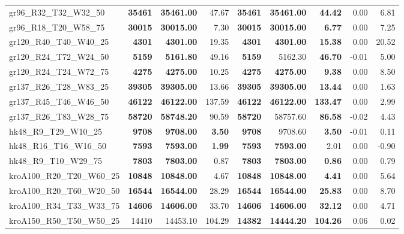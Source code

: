 \documentclass{singlecol-new}
\begin{document}
\begin{scriptsize}
\begin{longtable}{lrrrrrrrr}
		gr96\_R32\_T32\_W32\_50 & \textbf{35461} & \textbf{35461.00} & 47.67 & \textbf{35461} & \textbf{35461.00} & \textbf{44.42} & 0.00 & 6.81 \\
		gr96\_R18\_T20\_W58\_75 & \textbf{30015} & \textbf{30015.00} & 7.30 & \textbf{30015} & \textbf{30015.00} & \textbf{6.77} & 0.00 & 7.25 \\
		gr120\_R40\_T40\_W40\_25 & \textbf{4301} & \textbf{4301.00} & 19.35 & \textbf{4301} & \textbf{4301.00} & \textbf{15.38} & 0.00 & 20.52 \\
		gr120\_R24\_T72\_W24\_50 & \textbf{5159} & \textbf{5161.80} & 49.16 & \textbf{5159} & 5162.30 & \textbf{46.70} & -0.01 & 5.00 \\
		gr120\_R24\_T24\_W72\_75 & \textbf{4275} & \textbf{4275.00} & 10.25 & \textbf{4275} & \textbf{4275.00} & \textbf{9.38} & 0.00 & 8.50 \\
		gr137\_R26\_T28\_W83\_25 & \textbf{39305} & \textbf{39305.00} & 13.66 & \textbf{39305} & \textbf{39305.00} & \textbf{13.44} & 0.00 & 1.63 \\
		gr137\_R45\_T46\_W46\_50 & \textbf{46122} & \textbf{46122.00} & 137.59 & \textbf{46122} & \textbf{46122.00} & \textbf{133.47} & 0.00 & 2.99 \\
		gr137\_R26\_T83\_W28\_75 & \textbf{58720} & \textbf{58748.20} & 90.59 & \textbf{58720} & 58757.60 & \textbf{86.58} & -0.02 & 4.43 \\
		hk48\_R9\_T29\_W10\_25 & \textbf{9708} & \textbf{9708.00} & \textbf{3.50} & \textbf{9708} & 9708.60 & \textbf{3.50} & -0.01 & 0.11 \\
		hk48\_R16\_T16\_W16\_50 & \textbf{7593} & \textbf{7593.00} & \textbf{1.99} & \textbf{7593} & \textbf{7593.00} & 2.01 & 0.00 & -0.90 \\
		hk48\_R9\_T10\_W29\_75 & \textbf{7803} & \textbf{7803.00} & 0.87 & \textbf{7803} & \textbf{7803.00} & \textbf{0.86} & 0.00 & 0.79 \\
		kroA100\_R20\_T20\_W60\_25 & \textbf{10848} & \textbf{10848.00} & 4.67 & \textbf{10848} & \textbf{10848.00} & \textbf{4.41} & 0.00 & 5.64 \\
		kroA100\_R20\_T60\_W20\_50 & \textbf{16544} & \textbf{16544.00} & 28.29 & \textbf{16544} & \textbf{16544.00} & \textbf{25.83} & 0.00 & 8.70 \\
		kroA100\_R34\_T33\_W33\_75 & \textbf{14606} & \textbf{14606.00} & 33.70 & \textbf{14606} & \textbf{14606.00} & \textbf{32.12} & 0.00 & 4.71 \\
		kroA150\_R50\_T50\_W50\_25 & 14410 & 14453.10 & 104.29 & \textbf{14382} & \textbf{14444.20} & \textbf{104.26} & 0.06 & 0.02 \\

\end{longtable}
\end{scriptsize}
\end{document}
